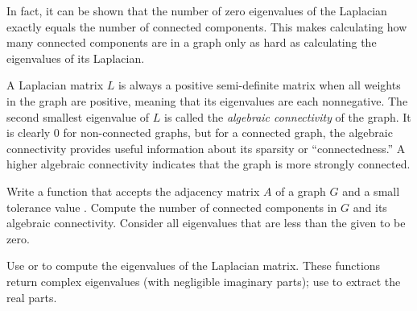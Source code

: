 In fact, it can be shown that the number of zero eigenvalues of the Laplacian exactly equals the number of connected components.
This makes calculating how many connected components are in a graph only as hard as calculating the eigenvalues of its Laplacian.

A Laplacian matrix $L$ is always a positive semi-definite matrix when all weights in the graph are positive, meaning that its eigenvalues are each nonnegative.
The second smallest eigenvalue of $L$ is called the \emph{algebraic connectivity} of the graph.
It is clearly $0$ for non-connected graphs, but for a connected graph, the algebraic connectivity provides useful information about its sparsity or ``connectedness.''
A higher algebraic connectivity indicates that the graph is more strongly connected.

\begin{problem}
Write a function that accepts the adjacency matrix $A$ of a graph $G$ and a small tolerance value .
Compute the number of connected components in $G$ and its algebraic connectivity.
Consider all eigenvalues that are less than the given  to be zero.

Use  or  to compute the eigenvalues of the Laplacian matrix.
These functions return complex eigenvalues (with negligible imaginary parts); use  to extract the real parts.
\end{problem}

\begin{comment} %
\begin{problem}
The folowing function creates a random symmetric matrix of Boolean values with sparsity determined by the input \li{c}.
\begin{lstlisting}
def sparse_generator(n, c):
    """Return a symmetric nxn matrix with sparsity determined by c."""
    A = np.random.rand(n**2).reshape((n, n))
    A = ( A > c**(.5) )
    return A.T @ A
\end{lstlisting}

Test your function from the previous problem on matrices created by \li{sparse_generator()} with inputs $n = 10, 100$ and $c = .25, .5, .95$.
What do you notice about the likelihood that a random graph is connected?
\end{problem}
\end{comment}


